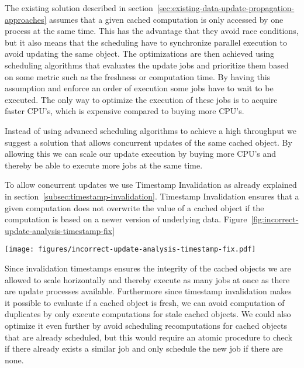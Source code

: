 The existing solution described in section~\ref{sec:existing-data-update-propagation-approaches} assumes that a given cached computation is only accessed by one process at the same time. This has the advantage that they avoid race conditions, but it also means that the scheduling have to synchronize parallel execution to avoid updating the same object. The optimizations are then achieved using scheduling algorithms that evaluates the update jobs and prioritize them based on some metric such as the freshness or computation time. By having this assumption and enforce an order of execution some jobs have to wait to be executed. The only way to optimize the execution of these jobs is to acquire faster CPU's, which is expensive compared to buying more CPU's.

Instead of using advanced scheduling algorithms to achieve a high throughput we suggest a solution that allows concurrent updates of the same cached object. By allowing this we can scale our update execution by buying more CPU's and thereby be able to execute more jobs at the same time.

To allow concurrent updates we use Timestamp Invalidation as already explained in section~\ref{subsec:timestamp-invalidation}. Timestamp Invalidation ensures that a given computation does not overwrite the value of a cached object if the computation is based on a newer version of underlying data. Figure~\ref{fig:incorrect-update-analysis-timestamp-fix}

\begin{figure*}[ht!]
  \centering
  \texttt{[image: figures/incorrect-update-analysis-timestamp-fix.pdf]}
  \caption{How Invalidation Timestamps fixes the concurrency problem described in figure~\ref{fig:incorrect-updates-analysis}.}
  \label{fig:incorrect-update-analysis-timestamp-fix}
\end{figure*}

Since invalidation timestamps ensures the integrity of the cached objects we are allowed to scale horizontally and thereby execute as many jobs at once as there are update processes available. Furthermore since timestamp invalidation makes it possible to evaluate if a cached object is fresh, we can avoid computation of duplicates by only execute computations for stale cached objects. We could also optimize it even further by avoid scheduling recomputations for cached objects that are already scheduled, but this would require an atomic procedure to check if there already exists a similar job and only schedule the new job if there are none.


